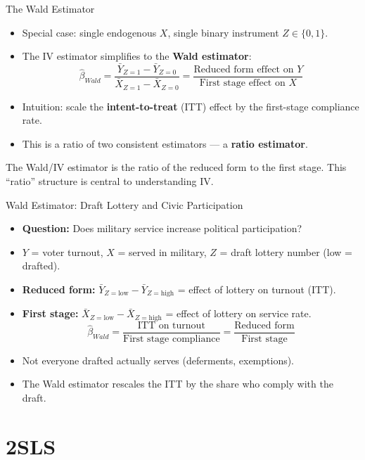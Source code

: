 \documentclass[aspectratio=169, handout]{beamer}
\numberwithin{equation}{section}
\begin{document}
\begin{frame}{The Wald Estimator}
\begin{itemize}
\item Special case: single endogenous $X$, single binary instrument $Z\in\{0,1\}$.
\item The IV estimator simplifies to the \textbf{Wald estimator}:
$$\hat{\beta}_{Wald} = \frac{\bar{Y}_{Z=1}-\bar{Y}_{Z=0}}{\bar{X}_{Z=1}-\bar{X}_{Z=0}} = \frac{\text{Reduced form effect on } Y}{\text{First stage effect on } X}$$
\item Intuition: scale the \textbf{intent-to-treat} (ITT) effect by the first-stage compliance rate.
\item This is a ratio of two consistent estimators --- a \textbf{ratio estimator}.
\end{itemize}
\begin{tcolorbox}[colback=blue!5, colframe=blue!50]
The Wald/IV estimator is the ratio of the reduced form to the first stage.  This ``ratio'' structure is central to understanding IV.
\end{tcolorbox}
\end{frame}


\begin{frame}{Wald Estimator: Draft Lottery and Civic Participation}
\begin{itemize}
\item \textbf{Question:} Does military service increase political participation?
\item $Y$ = voter turnout, $X$ = served in military, $Z$ = draft lottery number (low = drafted).
\item \textbf{Reduced form:} $\bar{Y}_{Z=\text{low}} - \bar{Y}_{Z=\text{high}}$ = effect of lottery on turnout (ITT).
\item \textbf{First stage:} $\bar{X}_{Z=\text{low}} - \bar{X}_{Z=\text{high}}$ = effect of lottery on service rate.
$$\hat{\beta}_{Wald} = \frac{\text{ITT on turnout}}{\text{First stage compliance}} = \frac{\text{Reduced form}}{\text{First stage}}$$
\item Not everyone drafted actually serves (deferments, exemptions).
\item The Wald estimator rescales the ITT by the share who comply with the draft.
\end{itemize}
\end{frame}


\section{2SLS}
\end{document}
